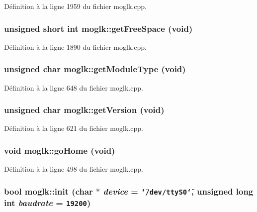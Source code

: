 Définition à la ligne 1959 du fichier moglk.cpp.\hypertarget{classmoglk_8dc3413e387ae4df9e10e73bd97fbdc5}{
\subsubsection[{getFreeSpace}]{\setlength{\rightskip}{0pt plus 5cm}unsigned short int moglk::getFreeSpace (void)}}
\label{classmoglk_8dc3413e387ae4df9e10e73bd97fbdc5}




Définition à la ligne 1890 du fichier moglk.cpp.\hypertarget{classmoglk_9fffd2e63880a4ea0ecf8e1d9f196668}{
\subsubsection[{getModuleType}]{\setlength{\rightskip}{0pt plus 5cm}unsigned char moglk::getModuleType (void)}}
\label{classmoglk_9fffd2e63880a4ea0ecf8e1d9f196668}




Définition à la ligne 648 du fichier moglk.cpp.\hypertarget{classmoglk_353d736b01087f171ceb14a7a01cd292}{
\subsubsection[{getVersion}]{\setlength{\rightskip}{0pt plus 5cm}unsigned char moglk::getVersion (void)}}
\label{classmoglk_353d736b01087f171ceb14a7a01cd292}




Définition à la ligne 621 du fichier moglk.cpp.\hypertarget{classmoglk_1f33a99d62509dfd98ca6898ba5a228e}{
\subsubsection[{goHome}]{\setlength{\rightskip}{0pt plus 5cm}void moglk::goHome (void)}}
\label{classmoglk_1f33a99d62509dfd98ca6898ba5a228e}




Définition à la ligne 498 du fichier moglk.cpp.\hypertarget{classmoglk_2b26bc8f68f3b4efcac9d1e6d902b695}{
\subsubsection[{init}]{\setlength{\rightskip}{0pt plus 5cm}bool moglk::init (char $\ast$ {\em device} = {\tt \char`\"{}/dev/ttyS0\char`\"{}}, \/  unsigned long int {\em baudrate} = {\tt 19200})}}
\label{classmoglk_2b26bc8f68f3b4efcac9d1e6d902b695}




